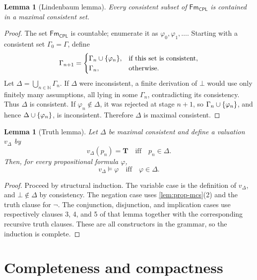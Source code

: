 \documentclass[11pt,oneside,openany]{book}
\theoremstyle{definition}
\theoremstyle{plain}
\newtheorem{lemma}[definition]{Lemma}
\theoremstyle{remark}
\DeclarePairedDelimiter{\set}{\lbrace}{\rbrace}
\newcommand{\N}{\mathbb{N}}
\newcommand{\Fm}{\mathsf{Fm}}
\newcommand{\entails}{\models}
\newcommand{\True}{\mathbf{T}}
\newcommand{\bottom}{\bot}
\newcommand{\CPL}{\mathsf{CPL}}
\begin{document}
\begin{lemma}[Lindenbaum lemma]
\label{lem:prop-lindenbaum}
Every consistent subset of \(\Fm_{\CPL}\) is contained in a maximal
consistent set.
\end{lemma}
\begin{proof}
The set \(\Fm_{\CPL}\) is countable; enumerate it as
\(\varphi_0,\varphi_1,\ldots\).  Starting with a consistent set
\(\Gamma_0=\Gamma\), define
\[
 \Gamma_{n+1}=
 \begin{cases}
   \Gamma_n\cup\set{\varphi_n},&
     \text{if this set is consistent},\\
   \Gamma_n,&\text{otherwise}.
 \end{cases}
\]
Let \(\Delta=\bigcup_{n\in\N}\Gamma_n\).  If \(\Delta\) were inconsistent,
a finite derivation of \(\bottom\) would use only finitely many assumptions,
all lying in some \(\Gamma_n\), contradicting its consistency.  Thus
\(\Delta\) is consistent.  If \(\varphi_n\notin\Delta\), it was rejected at
stage \(n+1\), so \(\Gamma_n\cup\set{\varphi_n}\), and hence
\(\Delta\cup\set{\varphi_n}\), is inconsistent.  Therefore \(\Delta\) is
maximal consistent.
\end{proof}

\begin{lemma}[Truth lemma]
\label{lem:prop-truth}
Let \(\Delta\) be maximal consistent and define a valuation \(v_\Delta\) by
\[
  v_\Delta(p_n)=\True\quad\text{iff}\quad p_n\in\Delta.
\]
Then, for every propositional formula \(\varphi\),
\[
  v_\Delta\entails\varphi
  \quad\text{iff}\quad
  \varphi\in\Delta.
\]
\end{lemma}
\begin{proof}
Proceed by structural induction.  The variable case is the definition of
\(v_\Delta\), and \(\bottom\notin\Delta\) by consistency.  The negation case
uses \cref{lem:prop-mcs}(2) and the truth clause for \(\neg\).  The
conjunction, disjunction, and implication cases use respectively clauses 3,
4, and 5 of that lemma together with the corresponding recursive truth
clauses.  These are all constructors in the grammar, so the induction is
complete.
\end{proof}

\section{Completeness and compactness}
\label{sec:prop-metatheory-03}
\end{document}
